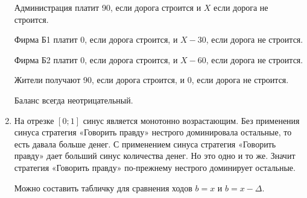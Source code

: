 \begin{enumerate}
Администрация платит 90, если дорога строится и $ X $ если дорога не строится.

Фирма Б1 платит 0, если дорога строится, и $ X-30 $, если дорога не строится.

Фирма Б2 платит 0, если дорога строится, и $ X-60 $, если дорога не строится.

Жители получают 90, если дорога строится, и 0, если дорога не строится.

Баланс всегда неотрицательный.


\item На отрезке $ [0;1] $ синус является монотонно возрастающим. Без применения синуса стратегия «Говорить правду» нестрого доминировала остальные, то есть давала больше денег. С применением синуса стратегия «Говорить правду» дает больший синус количества денег. Но это одно и то же. Значит стратегия «Говорить правду» по-прежнему нестрого доминирует остальные.

Можно составить табличку для сравнения ходов $ b=x $ и $ b=x-\Delta $.


\end{enumerate}
